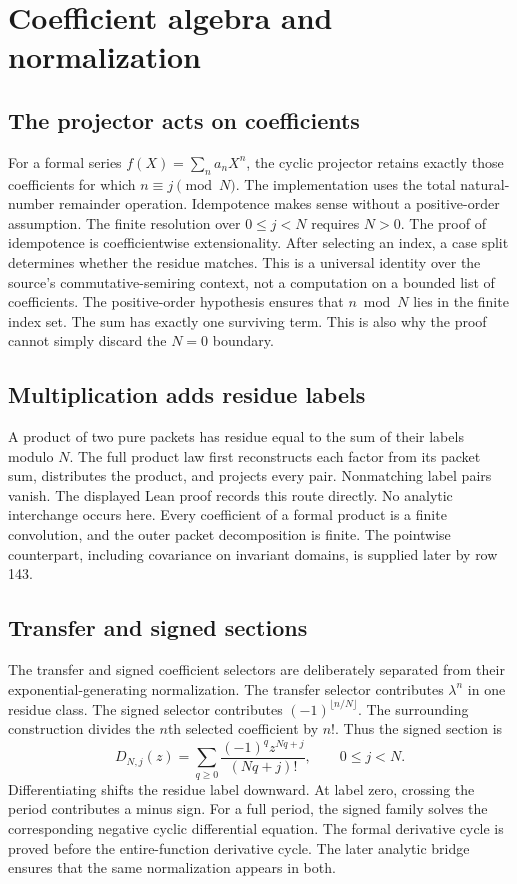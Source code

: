 \section{Coefficient algebra and normalization}
\subsection{The projector acts on coefficients}
For a formal series $f(X)=\sum_n a_nX^n$, the cyclic projector retains exactly those coefficients for which $n\equiv j\pmod N$. The implementation uses the total natural-number remainder operation. Idempotence makes sense without a positive-order assumption. The finite resolution over $0\leq j<N$ requires $N>0$.
The proof of idempotence is coefficientwise extensionality. After selecting an index, a case split determines whether the residue matches. This is a universal identity over the source's commutative-semiring context, not a computation on a bounded list of coefficients.
The positive-order hypothesis ensures that $n\bmod N$ lies in the finite index set. The sum has exactly one surviving term. This is also why the proof cannot simply discard the $N=0$ boundary.

\subsection{Multiplication adds residue labels}
A product of two pure packets has residue equal to the sum of their labels modulo $N$. The full product law first reconstructs each factor from its packet sum, distributes the product, and projects every pair. Nonmatching label pairs vanish. The displayed Lean proof records this route directly.
No analytic interchange occurs here. Every coefficient of a formal product is a finite convolution, and the outer packet decomposition is finite. The pointwise counterpart, including covariance on invariant domains, is supplied later by row 143.

\subsection{Transfer and signed sections}
The transfer and signed coefficient selectors are deliberately separated from their exponential-generating normalization.
The transfer selector contributes $\lambda^n$ in one residue class. The signed selector contributes $(-1)^{\lfloor n/N\rfloor}$. The surrounding  construction divides the $n$th selected coefficient by $n!$. Thus the signed section is
\[
 D_{N,j}(z)=\sum_{q\geq0}\frac{(-1)^qz^{Nq+j}}{(Nq+j)!},\qquad 0\leq j<N.
\]
Differentiating shifts the residue label downward. At label zero, crossing the period contributes a minus sign.
For a full period, the signed family solves the corresponding negative cyclic differential equation. The formal derivative cycle is proved before the entire-function derivative cycle. The later analytic bridge ensures that the same normalization appears in both.

